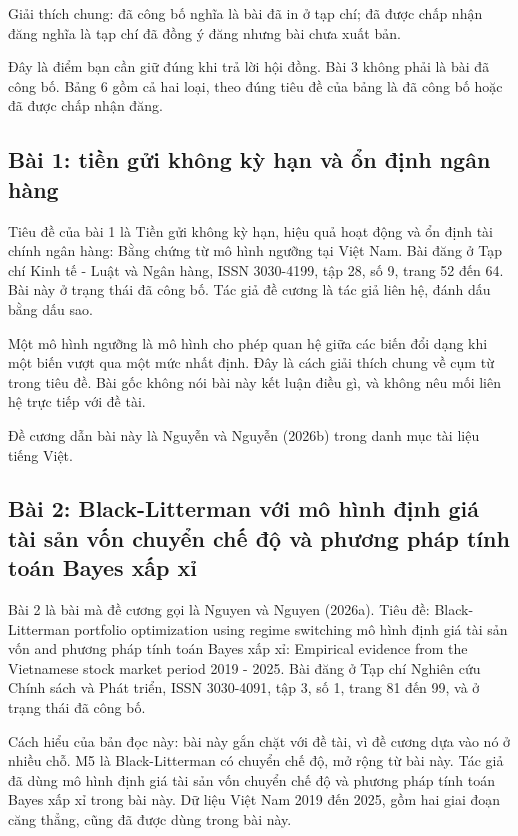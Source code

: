 Giải thích chung: đã công bố nghĩa là bài đã in ở tạp chí; đã được chấp nhận đăng nghĩa là tạp chí đã đồng ý đăng nhưng bài chưa xuất bản.

Đây là điểm bạn cần giữ đúng khi trả lời hội đồng. Bài 3 không phải là bài đã công bố. Bảng 6 gồm cả hai loại, theo đúng tiêu đề của bảng là đã công bố hoặc đã được chấp nhận đăng.

\subsection{Bài 1: tiền gửi không kỳ hạn và ổn định ngân hàng}

Tiêu đề của bài 1 là Tiền gửi không kỳ hạn, hiệu quả hoạt động và ổn định tài chính ngân hàng: Bằng chứng từ mô hình ngưỡng tại Việt Nam. Bài đăng ở Tạp chí Kinh tế - Luật và Ngân hàng, ISSN 3030-4199, tập 28, số 9, trang 52 đến 64. Bài này ở trạng thái đã công bố. Tác giả đề cương là tác giả liên hệ, đánh dấu bằng dấu sao.

Một mô hình ngưỡng là mô hình cho phép quan hệ giữa các biến đổi dạng khi một biến vượt qua một mức nhất định. Đây là cách giải thích chung về cụm từ trong tiêu đề. Bài gốc không nói bài này kết luận điều gì, và không nêu mối liên hệ trực tiếp với đề tài.

Đề cương dẫn bài này là Nguyễn và Nguyễn (2026b) trong danh mục tài liệu tiếng Việt.

\subsection{Bài 2: Black-Litterman với mô hình định giá tài sản vốn chuyển chế độ và phương pháp tính toán Bayes xấp xỉ}

Bài 2 là bài mà đề cương gọi là Nguyen và Nguyen (2026a). Tiêu đề: Black-Litterman portfolio optimization using regime switching mô hình định giá tài sản vốn and phương pháp tính toán Bayes xấp xỉ: Empirical evidence from the Vietnamese stock market period 2019 - 2025. Bài đăng ở Tạp chí Nghiên cứu Chính sách và Phát triển, ISSN 3030-4091, tập 3, số 1, trang 81 đến 99, và ở trạng thái đã công bố.

Cách hiểu của bản đọc này: bài này gắn chặt với đề tài, vì đề cương dựa vào nó ở nhiều chỗ. M5 là Black-Litterman có chuyển chế độ, mở rộng từ bài này. Tác giả đã dùng mô hình định giá tài sản vốn chuyển chế độ và phương pháp tính toán Bayes xấp xỉ trong bài này. Dữ liệu Việt Nam 2019 đến 2025, gồm hai giai đoạn căng thẳng, cũng đã được dùng trong bài này.


